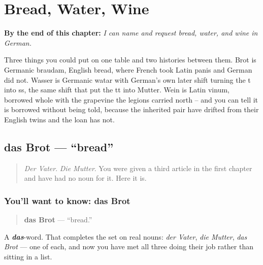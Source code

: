
\chapter{Bread, Water, Wine}
\label{ch:food}

\begin{chapteropening}
\textbf{By the end of this chapter:} \emph{I can name and request bread, water, and wine in German.}

Three things you could put on one table and two histories between them. Brot is Germanic braudam, English bread, where French took Latin panis and German did not. Wasser is Germanic watar with German's own later shift turning the t into ss, the same shift that put the tt into Mutter. Wein is Latin vinum, borrowed whole with the grapevine the legions carried north -- and you can tell it is borrowed without being told, because the inherited pair have drifted from their English twins and the loan has not.
\end{chapteropening}

\section[das Brot]{das Brot — \textquotedblleft{}bread\textquotedblright{}}

\label{lesson:GE-C11-brot}



\begin{quote}
\emph{Der Vater}. \emph{Die Mutter}. You were given a third article in the first chapter and have had no noun for it. Here it is.
\end{quote}

\subsection*{You'll want to know: das Brot}
\begin{quote}
\textbf{das Brot} — \textquotedblleft{}bread.\textquotedblright{}
\end{quote}

A \emph{\textbf{das}}-word. That completes the set on real nouns: \emph{der Vater}, \emph{die Mutter}, \emph{das Brot} — one of each, and now you have met all three doing their job rather than sitting in a list.

